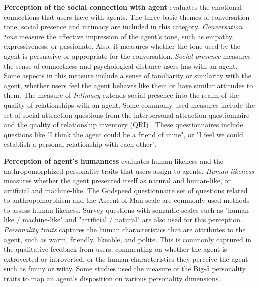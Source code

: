 \documentclass[sigconf,screen,review, anonymous]{acmart}
\newcommand{\cmt}[1]{}%
\begin{document}
\textbf{Perception of the social connection with agent} evaluates the emotional connections that users have with agents. The three basic themes of conversation tone, social presence and intimacy are included in this category. \textit{Conversation tone} measure the affective impression of the agent's tone, such as empathy, expressiveness, or passionate. Also, it measures whether the tone used by the agent is persuasive or appropriate for the conversation. \textit{Social presence} measures the sense of connectness and psychological distance users has with an agent. Some aspects in this measure include a sense of familiarity or similarity with the agent, whether users feel the agent behaves like them or have similar attitudes to them. The measure of \textit{Intimacy} extends social presence into the realm of the quality of relationships with an agent. Some commonly used measures include the set of social attraction questions from the interpersonal attraction questionnaire \cite{mccroskey1975development} and the quality of relationship inventory (QRI) \cite{pierce1997assessing}. These questionnaires include questions like "I think the agent could be a friend of mine", or "I feel we could establish a personal relationship with each other".

\textbf{Perception of agent's humanness} evaluates human-likeness and the anthropomorphized personality traits that users assign to agents. \textit{Human-likeness} measures whether the agent presented itself as natural and human-like, or artificial and machine-like. The Godspeed questionnaire \cite{bartneck2009measurement}\cmt{godspeed} set of questions related to anthropomorphism and the Ascent of Man scale \cite{kteily2015ascent} are commonly used methods to assess human-likeness. Survey questions with semantic scales such as "human-like / machine-like" and "artificial / natural" are also used for this perception. \textit{Personality traits} captures the human characteristics that are attributes to the agent, such as warm, friendly, likeable, and polite. This is commonly captured in the qualitative feedback from users, commenting on whether the agent is extroverted or introverted, or the human characteristics they perceive the agent such as funny or witty. Some studies used the measure of the Big-5 personality traits \cite{gosling2003very} to map an agent's disposition on various personality dimensions.
\end{document}
